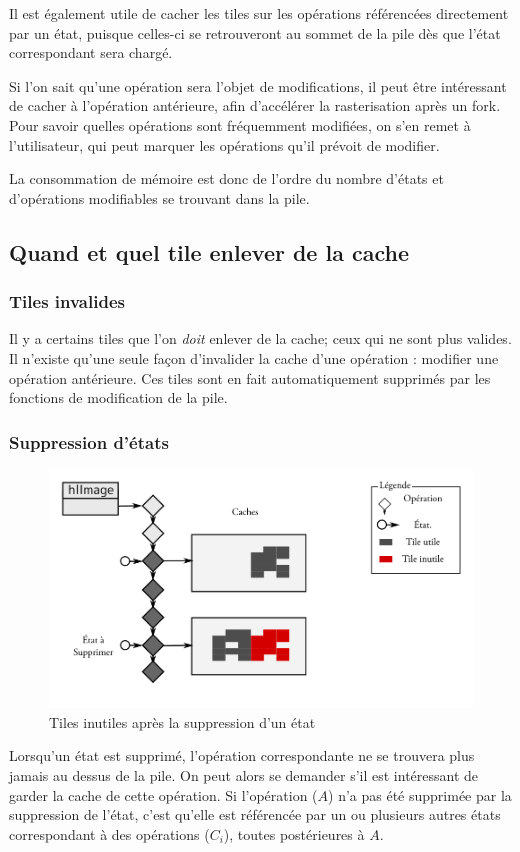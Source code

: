 			Il est également utile de cacher les tiles sur les opérations référencées directement par un état, puisque
			celles-ci se retrouveront au sommet de la pile dès que l'état correspondant sera chargé. 

			Si l'on sait qu'une opération sera l'objet de modifications, il peut être intéressant de cacher à l'opération
			antérieure, afin d'accélérer la rasterisation après un fork. Pour savoir quelles opérations sont fréquemment
			modifiées, on s'en remet à l'utilisateur, qui peut marquer les opérations qu'il prévoit de modifier. 

			La consommation de mémoire est donc de l'ordre du nombre d'états et d'opérations modifiables se trouvant dans la pile.
		\subsection{Quand et quel tile enlever de la cache}
			\subsubsection{Tiles invalides}
			Il y a certains tiles que l'on \emph{doit} enlever de la cache; ceux qui ne sont plus valides. Il n'existe qu'une 
			seule façon d'invalider la cache d'une opération : modifier une opération antérieure. Ces tiles sont en fait
			automatiquement supprimés par les fonctions de modification de la pile.
			
			\subsubsection{Suppression d'états}
		\begin{figure}[ht]
			\centering
			\includegraphics[width=\textwidth]{images/state-destruct} 
			\caption{Tiles inutiles après la suppression d'un état}
			\label{fig:destruct}
		\end{figure}
			Lorsqu'un état est supprimé, l'opération correspondante ne se trouvera plus jamais au dessus de la pile. On peut alors se
			demander s'il est intéressant de garder la cache de cette opération. Si l'opération ($A$) n'a pas été supprimée par la suppression
			de l'état, c'est qu'elle est référencée par un ou plusieurs autres états correspondant à des opérations ($C_i$), toutes postérieures à
			$A$. 

